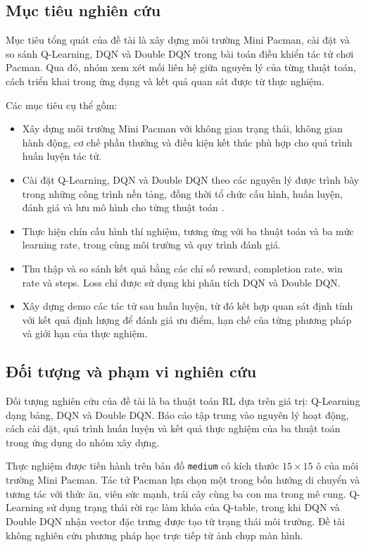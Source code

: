 \subsection{Mục tiêu nghiên cứu}

Mục tiêu tổng quát của đề tài là xây dựng môi trường Mini Pacman, cài đặt và so sánh Q-Learning, DQN và Double DQN trong bài toán điều khiển tác tử chơi Pacman. Qua đó, nhóm xem xét mối liên hệ giữa nguyên lý của từng thuật toán, cách triển khai trong ứng dụng và kết quả quan sát được từ thực nghiệm.

\noindent Các mục tiêu cụ thể gồm:

\begin{itemize}
    \item Xây dựng môi trường Mini Pacman với không gian trạng thái, không gian hành động, cơ chế phần thưởng và điều kiện kết thúc phù hợp cho quá trình huấn luyện tác tử.
    \item Cài đặt Q-Learning, DQN và Double DQN theo các nguyên lý được trình bày trong những công trình nền tảng, đồng thời tổ chức cấu hình, huấn luyện, đánh giá và lưu mô hình cho từng thuật toán \cite{WatkinsDayan1992,Mnih2013,Mnih2015,VanHasselt2016}.
    \item Thực hiện chín cấu hình thí nghiệm, tương ứng với ba thuật toán và ba mức learning rate, trong cùng môi trường và quy trình đánh giá.
    \item Thu thập và so sánh kết quả bằng các chỉ số reward, completion rate, win rate và steps. Loss chỉ được sử dụng khi phân tích DQN và Double DQN.
    \item Xây dựng demo các tác tử sau huấn luyện, từ đó kết hợp quan sát định tính với kết quả định lượng để đánh giá ưu điểm, hạn chế của từng phương pháp và giới hạn của thực nghiệm.
\end{itemize}

\subsection{Đối tượng và phạm vi nghiên cứu}

Đối tượng nghiên cứu của đề tài là ba thuật toán RL dựa trên giá trị: Q-Learning dạng bảng, DQN và Double DQN. Báo cáo tập trung vào nguyên lý hoạt động, cách cài đặt, quá trình huấn luyện và kết quả thực nghiệm của ba thuật toán trong ứng dụng do nhóm xây dựng.

Thực nghiệm được tiến hành trên bản đồ \texttt{medium} có kích thước $15 \times 15$ ô của môi trường Mini Pacman. Tác tử Pacman lựa chọn một trong bốn hướng di chuyển và tương tác với thức ăn, viên sức mạnh, trái cây cùng ba con ma trong mê cung. Q-Learning sử dụng trạng thái rời rạc làm khóa của Q-table, trong khi DQN và Double DQN nhận vector đặc trưng được tạo từ trạng thái môi trường. Đề tài không nghiên cứu phương pháp học trực tiếp từ ảnh chụp màn hình.

